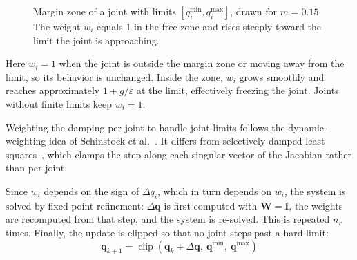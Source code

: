 \documentclass[12pt,a4paper]{article}
\begin{document}
\begin{figure}[htbp]
    \centering
    \caption{\small{Margin zone of a joint with limits $[q_i^{\min},q_i^{\max}]$, drawn for $m=0.15$. The weight $w_i$ equals 1 in the free zone and rises steeply toward the limit the joint is approaching.}}
    \label{fig:margin_zone}
\end{figure}
Here $w_i=1$ when the joint is outside the margin zone or moving away from the limit, so its behavior is unchanged. Inside the zone, $w_i$ grows smoothly and reaches approximately $1+g/\varepsilon$ at the limit, effectively freezing the joint. Joints without finite limits keep $w_i=1$.

Weighting the damping per joint to handle joint limits follows the dynamic-weighting idea of Schinstock et al.~\cite{schinstock1994}. It differs from selectively damped least squares~\cite{bussKim2004}, which clamps the step along each singular vector of the Jacobian rather than per joint.

\newpage
Since $w_i$ depends on the sign of $\Delta q_i$, which in turn depends on $w_i$, the system is solved by fixed-point refinement: $\Delta\mathbf{q}$ is first computed with $\mathbf{W}=\mathbf{I}$, the weights are recomputed from that step, and the system is re-solved. This is repeated $n_r$ times. Finally, the update is clipped so that no joint steps past a hard limit:
\begin{equation}
    \mathbf{q}_{k+1} = \operatorname{clip}\!\left(\mathbf{q}_k + \Delta\mathbf{q},\ \mathbf{q}^{\min},\ \mathbf{q}^{\max}\right)
\end{equation}
\end{document}
